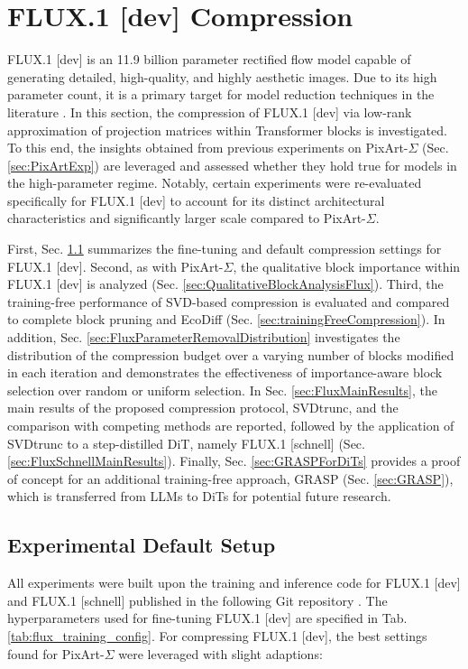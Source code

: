 \section{FLUX.1 {[dev]} Compression}
\label{sec:ExpFlux}
FLUX.1 {[dev]} is an 11.9 billion parameter rectified flow model capable of generating detailed, high-quality, and highly aesthetic images. Due to its high parameter count, it is a primary target for model reduction techniques in the literature \cite{FastFlux,HierarchicalPrune,PPCL,Dense2MoE,flux1-lite}. In this section, the compression of FLUX.1 {[dev]} via low-rank approximation of projection matrices within Transformer blocks is investigated. To this end, the insights obtained from previous experiments on PixArt-$\Sigma$ (Sec. \ref{sec:PixArtExp}) are leveraged and assessed whether they hold true for models in the high-parameter regime. Notably, certain experiments were re-evaluated specifically for FLUX.1 {[dev]} to account for its distinct architectural characteristics and significantly larger scale compared to PixArt-$\Sigma$.

First, Sec. \ref{sec:flux_training_details} summarizes the fine-tuning and default compression settings for FLUX.1 {[dev]}.
Second, as with PixArt-$\Sigma$, the qualitative block importance within FLUX.1 {[dev]} is analyzed (Sec. \ref{sec:QualitativeBlockAnalysisFlux}). Third, the training-free performance of \gls{SVD}-based compression is evaluated and compared to complete block pruning and EcoDiff \cite{EcoDiff} (Sec. \ref{sec:trainingFreeCompression}). In addition, Sec. \ref{sec:FluxParameterRemovalDistribution} investigates the distribution of the compression budget over a varying number of blocks modified in each iteration and demonstrates the effectiveness of importance-aware block selection over random or uniform selection. In Sec. \ref{sec:FluxMainResults}, the main results of the proposed compression protocol, \gls{SVD}trunc, and the comparison with competing methods are reported, followed by the application of \gls{SVD}trunc to a step-distilled \gls{DiT}, namely FLUX.1 {[schnell]} (Sec. \ref{sec:FluxSchnellMainResults}). Finally, Sec. \ref{sec:GRASPForDiTs} provides a proof of concept for an additional training-free approach, GRASP (Sec. \ref{sec:GRASP}), which is transferred from \gls{LLM}s to \gls{DiT}s for potential future research.



\subsection{Experimental Default Setup}
\label{sec:flux_training_details}
All experiments were built upon the training and inference code for FLUX.1 {[dev]} and FLUX.1 {[schnell]} published in the following Git repository \cite{kohya_ss_sd_scripts_2024}. The hyperparameters used for fine-tuning FLUX.1 {[dev]} are specified in Tab. \ref{tab:flux_training_config}. For compressing FLUX.1 {[dev]}, the best settings found for PixArt-$\Sigma$ were leveraged with slight adaptions:

